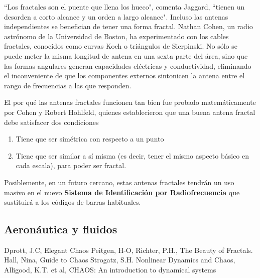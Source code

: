 \begin{example}
``Los fractales son el puente que llena los hueco", comenta Jaggard, ``tienen un desorden a corto alcance y un orden a largo alcance". Incluso las antenas independientes se benefician de tener una forma fractal. Nathan Cohen, un radio astrónomo de la Universidad de Boston, ha experimentado con los cables fractales, conocidos como curvas Koch o triángulos de Sierpinski. No sólo se puede meter la misma longitud de antena en una sexta parte del área, sino que las formas angulares generan capacidades eléctricas y conductividad, eliminando el inconveniente de que los componentes externos sintonicen la antena entre el rango de frecuencias a las que responden.

El por qué las antenas fractales funcionen tan bien fue probado matemáticamente por Cohen y Robert Hohlfeld, quienes establecieron que una buena antena fractal debe satisfacer dos condiciones
\begin{enumerate}
\item Tiene que ser simétrica con respecto a un punto
\item Tiene que ser similar a sí misma (es decir, tener el mismo aspecto básico en cada escala), para poder ser fractal.
\end{enumerate}

Posiblemente, en un futuro cercano, estas antenas fractales tendrán un uso masivo en el nuevo \textbf{Sistema de Identificación por Radiofrecuencia} que sustituirá a los códigos de barras habituales.
\end{example}

\subsection{Aeronáutica y fluidos}

\newpage

\begin{thebibliography}{1}
Dprott, J.C, Elegant Chaos
Peitgen, H-O, Richter, P.H., The Beauty of Fractals.
Hall, Nina, Guide to Chaos
Strogatz, S.H. Nonlinear Dynamics and Chaos,
Alligood, K.T. et al, CHAOS: An introduction to dynamical systems
\end{thebibliography}

